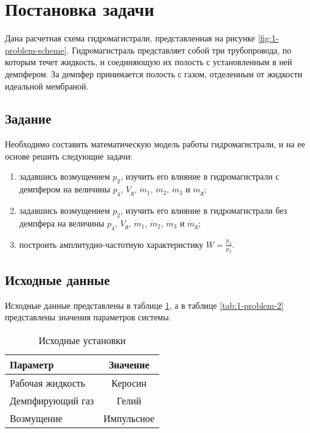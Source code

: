 \section{Постановка задачи}

Дана расчетная схема гидромагистрали, представленная на рисунке \ref{fig:1-problem-scheme}. Гидромагистраль представляет собой три трубопровода, по которым течет жидкость, и соединяющую их полость с установленным в ней демпфером. За демпфер принимается полость с газом, отделенным от жидкости идеальной мембраной.



\subsection{Задание} 

Необходимо составить математическую модель работы гидромагистрали, и на ее основе решить следующие задачи:
\begin{enumerate}
    \item задавшись возмущением $p_2$, изучить его влияние в гидромагистрали с демпфером на величины $p_4$, $V_{\text{д}}$, $\dot{m}_1$, $\dot{m}_2$, $\dot{m}_3$ и $\dot{m}_{\text{д}}$;
    \item задавшись возмущением $p_2$, изучить его влияние в гидромагистрали без демпфера на величины $p_4$, $V_{\text{д}}$, $\dot{m}_1$, $\dot{m}_2$, $\dot{m}_3$ и $\dot{m}_{\text{д}}$;
    \item построить амплитудно-частотную характеристику $W = \frac{p_4}{p_2}$.
\end{enumerate}


\subsection{Исходные данные}

Исходные данные представлены в таблице \ref{tab:1-problem}, а в таблице \ref{tab:1-problem-2} представлены значения параметров системы.

\begin{table}[H]
    \caption{Исходные установки}
    \label{tab:1-problem}
    \centering
    \begin{tabular}{ |l|c| }
        \hline \textbf{Параметр} & \textbf{Значение} \\
        \hline Рабочая жидкость & Керосин \\
        \hline Демпфирующий газ & Гелий \\
        \hline Возмущение & Импульсное \\
        \hline
    \end{tabular}
\end{table}

